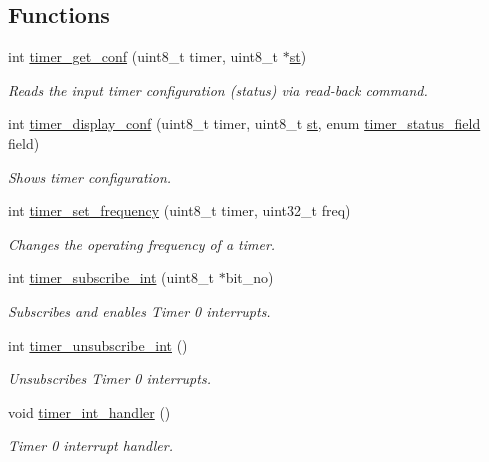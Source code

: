 \subsection*{Functions}
\begin{DoxyCompactItemize}
\item 
int \mbox{\hyperlink{group__timer_gafafc1891c876602d55b894103b1841a7}{timer\+\_\+get\+\_\+conf}} (uint8\+\_\+t timer, uint8\+\_\+t $\ast$\mbox{\hyperlink{mouse_8c_a06c4c56ffe97daec8ce7a2db42cadc96}{st}})
\begin{DoxyCompactList}\small\item\em Reads the input timer configuration (status) via read-\/back command. \end{DoxyCompactList}\item 
int \mbox{\hyperlink{group__timer_ga2f6a1c71f61dce5b3b6eecba83e7d7e9}{timer\+\_\+display\+\_\+conf}} (uint8\+\_\+t timer, uint8\+\_\+t \mbox{\hyperlink{mouse_8c_a06c4c56ffe97daec8ce7a2db42cadc96}{st}}, enum \mbox{\hyperlink{group__timer_gada782f3116a896caaa602b70c0c6d8b7}{timer\+\_\+status\+\_\+field}} field)
\begin{DoxyCompactList}\small\item\em Shows timer configuration. \end{DoxyCompactList}\item 
int \mbox{\hyperlink{group__timer_gaca1506be74dfc71c6f90772ca269c619}{timer\+\_\+set\+\_\+frequency}} (uint8\+\_\+t timer, uint32\+\_\+t freq)
\begin{DoxyCompactList}\small\item\em Changes the operating frequency of a timer. \end{DoxyCompactList}\item 
int \mbox{\hyperlink{group__timer_ga6f786481e80308348d629d605ffa2d84}{timer\+\_\+subscribe\+\_\+int}} (uint8\+\_\+t $\ast$bit\+\_\+no)
\begin{DoxyCompactList}\small\item\em Subscribes and enables Timer 0 interrupts. \end{DoxyCompactList}\item 
int \mbox{\hyperlink{group__timer_gab9eea51549744bca5c5c923b388bb4ee}{timer\+\_\+unsubscribe\+\_\+int}} ()
\begin{DoxyCompactList}\small\item\em Unsubscribes Timer 0 interrupts. \end{DoxyCompactList}\item 
void \mbox{\hyperlink{group__timer_ga10fc9c867b15c7da6649311c9987cd17}{timer\+\_\+int\+\_\+handler}} ()
\begin{DoxyCompactList}\small\item\em Timer 0 interrupt handler. \end{DoxyCompactList}\end{DoxyCompactItemize}
